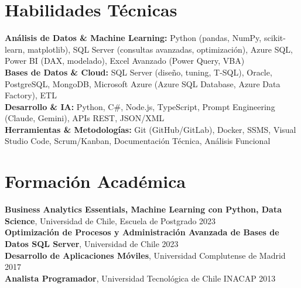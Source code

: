 \documentclass[11pt,letterpaper]{article}
\begin{document}
\section{Habilidades T\'{e}cnicas}
\textbf{Análisis de Datos \& Machine Learning:} Python (pandas, NumPy, scikit-learn, matplotlib), SQL Server (consultas avanzadas, optimización), Azure SQL, Power BI (DAX, modelado), Excel Avanzado (Power Query, VBA) \\
\textbf{Bases de Datos \& Cloud:} SQL Server (diseño, tuning, T-SQL), Oracle, PostgreSQL, MongoDB, Microsoft Azure (Azure SQL Database, Azure Data Factory), ETL \\
\textbf{Desarrollo \& IA:} Python, C\#, Node.js, TypeScript, Prompt Engineering (Claude, Gemini), APIs REST, JSON/XML \\
\textbf{Herramientas \& Metodologías:} Git (GitHub/GitLab), Docker, SSMS, Visual Studio Code, Scrum/Kanban, Documentación Técnica, Análisis Funcional

\section{Formaci\'{o}n Acad\'{e}mica}
\textbf{Business Analytics Essentials, Machine Learning con Python, Data Science}, Universidad de Chile, Escuela de Postgrado \hfill 2023 \\
\textbf{Optimización de Procesos y Administración Avanzada de Bases de Datos SQL Server}, Universidad de Chile \hfill 2023 \\
\textbf{Desarrollo de Aplicaciones Móviles}, Universidad Complutense de Madrid \hfill 2017 \\
\textbf{Analista Programador}, Universidad Tecnológica de Chile INACAP \hfill 2013
\end{document}
